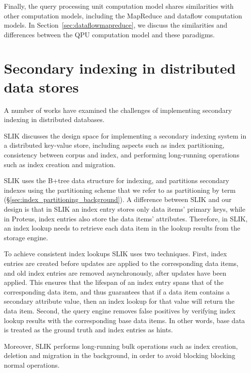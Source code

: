 Finally, the query processing unit computation model shares similarities with other computation models,
including the MapReduce and dataflow computation models.
In Section~\ref{sec:dataflowmapreduce},
we discuss the similarities and differences between the QPU computation model and these paradigms.


\section{Secondary indexing in distributed data stores}
\label{sec:secondaryindexing}

A number of works \cite{kejriwal:slik, dsilva:tworings, tan:diffindex, tang:deferredindexing}
have examined the challenges of implementing secondary indexing in distributed databases.

SLIK \cite{kejriwal:slik} discusses the design space for implementing a secondary indexing system in a distributed key-value store,
including aspects such as index partitioning, consistency between corpus and index,
and performing long-running operations such as index creation and migration.

SLIK uses the B+tree data structure for indexing,
and partitions secondary indexes using the partitioning scheme that we refer to as partitioning by term (\S\ref{sec:index_partitioning_background}).
A difference between SLIK and our design is that in SLIK an index entry stores only data items' primary keys,
while in Proteus, index entries also store the data items' attributes.
Therefore, in SLIK, an index lookup needs to retrieve each data item in the lookup results from the storage engine.

To achieve consistent index lookups SLIK uses two techniques.
First, index entries are created before updates are applied to the corresponding data items,
and old index entries are removed asynchronously, after updates have been applied.
This ensures that the lifespan of an index entry spans that of the corresponding data item,
and thus guarantees that if a data item contains a secondary attribute value, then an index lookup for that value will
return the data item.
Second, the query engine removes false positives by verifying index lookup results with the corresponding base data items.
In other words, base data is treated as the ground truth and index entries as hints.

Moreover, SLIK performs long-running bulk operations such as index creation, deletion and migration in the background,
in order to avoid blocking blocking normal operations.

